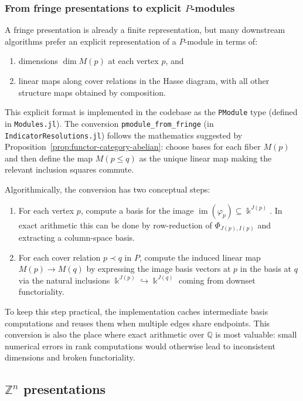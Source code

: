 \documentclass{article}
\newcommand{\kk}{\Bbbk}
\newcommand{\<}{\langle}
\renewcommand{\>}{\rangle}
\DeclareMathOperator{\im}{im}
\theoremstyle{definition}
\theoremstyle{remark}
\begin{document}
	\subsubsection*{From fringe presentations to explicit $P$-modules}
	
	A fringe presentation is already a finite representation, but many downstream algorithms prefer an explicit
	representation of a $P$-module in terms of:
	\begin{enumerate}[label=(\roman*)]
		\item dimensions $\dim M(p)$ at each vertex $p$, and
		\item linear maps along cover relations in the Hasse diagram, with all other structure maps obtained by
		composition.
	\end{enumerate}
	This explicit format is implemented in the codebase as the \texttt{PModule} type (defined in \texttt{Modules.jl}).
	The conversion \texttt{pmodule\_from\_fringe} (in \texttt{IndicatorResolutions.jl}) follows the mathematics
	suggested by Proposition~\ref{prop:functor-category-abelian}: choose bases for each fiber $M(p)$ and then define the
	map $M(p\le q)$ as the unique linear map making the relevant inclusion squares commute.
	
	Algorithmically, the conversion has two conceptual steps:
	\begin{enumerate}[label=(\roman*)]
		\item For each vertex $p$, compute a basis for the image $\im(\varphi_p)\subseteq \kk^{J(p)}$.
		In exact arithmetic this can be done by row-reduction of $\Phi_{J(p),I(p)}$ and extracting a column-space basis.
		\item For each cover relation $p\prec q$ in $P$, compute the induced linear map
		$M(p)\to M(q)$ by expressing the image basis vectors at $p$ in the basis at $q$ via the natural inclusions
		$\kk^{J(p)}\hookrightarrow \kk^{J(q)}$ coming from downset functoriality.
	\end{enumerate}
	To keep this step practical, the implementation caches intermediate basis computations and reuses them when multiple
	edges share endpoints.  This conversion is also the place where exact arithmetic over $\mathbb{Q}$ is most valuable:
	small numerical errors in rank computations would otherwise lead to inconsistent dimensions and broken functoriality.
	
	\subsection{$\mathbb{Z}^n$ presentations}\label{subsec:Zn-presentations}
	
\end{document}
